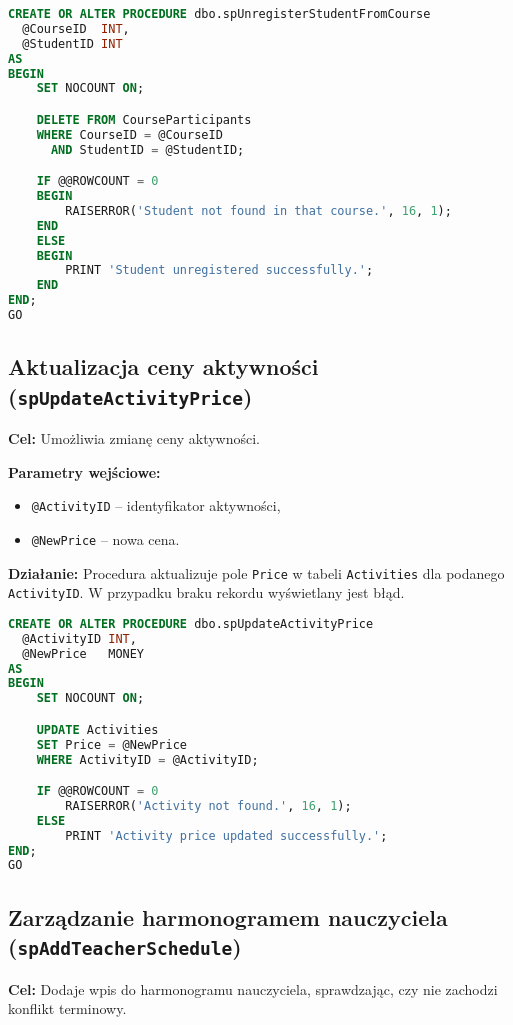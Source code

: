 \documentclass[12pt]{article}
\begin{document}
\begin{lstlisting}[language=SQL]
CREATE OR ALTER PROCEDURE dbo.spUnregisterStudentFromCourse
  @CourseID  INT,
  @StudentID INT
AS
BEGIN
    SET NOCOUNT ON;

    DELETE FROM CourseParticipants
    WHERE CourseID = @CourseID
      AND StudentID = @StudentID;

    IF @@ROWCOUNT = 0
    BEGIN
        RAISERROR('Student not found in that course.', 16, 1);
    END
    ELSE
    BEGIN
        PRINT 'Student unregistered successfully.';
    END
END;
GO
\end{lstlisting}

\newpage
\subsection{Aktualizacja ceny aktywności (\texttt{spUpdateActivityPrice})}
\textbf{Cel:} Umożliwia zmianę ceny aktywności.

\textbf{Parametry wejściowe:}
\begin{itemize}
  \item \texttt{@ActivityID} – identyfikator aktywności,
  \item \texttt{@NewPrice} – nowa cena.
\end{itemize}

\textbf{Działanie:} Procedura aktualizuje pole \verb|Price| w tabeli \verb|Activities| dla podanego \verb|ActivityID|. W przypadku braku rekordu wyświetlany jest błąd.

\begin{lstlisting}[language=SQL]
CREATE OR ALTER PROCEDURE dbo.spUpdateActivityPrice
  @ActivityID INT,
  @NewPrice   MONEY
AS
BEGIN
    SET NOCOUNT ON;

    UPDATE Activities
    SET Price = @NewPrice
    WHERE ActivityID = @ActivityID;

    IF @@ROWCOUNT = 0
        RAISERROR('Activity not found.', 16, 1);
    ELSE
        PRINT 'Activity price updated successfully.';
END;
GO
\end{lstlisting}

\newpage
\subsection{Zarządzanie harmonogramem nauczyciela (\texttt{spAddTeacherSchedule})}
\textbf{Cel:} Dodaje wpis do harmonogramu nauczyciela, sprawdzając, czy nie zachodzi konflikt terminowy.
\end{document}
